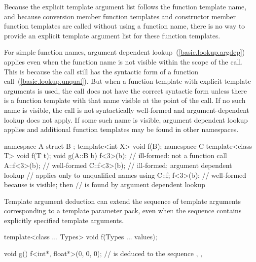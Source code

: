 \pnum
\begin{note}
Because the explicit template argument list follows the function
template name, and because conversion member function templates and
constructor member function templates are called without using a
function name, there is no way to provide an explicit template
argument list for these function templates.
\end{note}

\pnum
\begin{note}
For simple function names, argument dependent lookup~(\ref{basic.lookup.argdep})
applies even when the function name is not visible within the scope of the call.
This is because the call still has the syntactic form of a function call~(\ref{basic.lookup.unqual}).
But when a function template with explicit template arguments is used,
the call does not have the correct syntactic form unless there is a function
template with that name visible at the point of the call.
If no such name is visible,
the call is not syntactically well-formed and argument-dependent lookup
does not apply.
If some such name is visible,
argument dependent lookup applies and additional function templates
may be found in other namespaces.
\begin{example}

\begin{codeblock}
namespace A {
  struct B { };
  template<int X> void f(B);
}
namespace C {
  template<class T> void f(T t);
}
void g(A::B b) {
  f<3>(b);                      // ill-formed: not a function call
  A::f<3>(b);                   // well-formed
  C::f<3>(b);                   // ill-formed; argument dependent lookup
                                // applies only to unqualified names
  using C::f;
  f<3>(b);                      // well-formed because  is visible; then
                                //  is found by argument dependent lookup
}
\end{codeblock}
\end{example}
\end{note}

\pnum
Template argument deduction can extend the sequence of template
arguments corresponding to a template parameter pack, even when the
sequence contains explicitly specified template arguments.
\begin{example}
\begin{codeblock}
template<class ... Types> void f(Types ... values);

void g() {
  f<int*, float*>(0, 0, 0);     //  is deduced to the sequence , , 
}
\end{codeblock}
\end{example}


